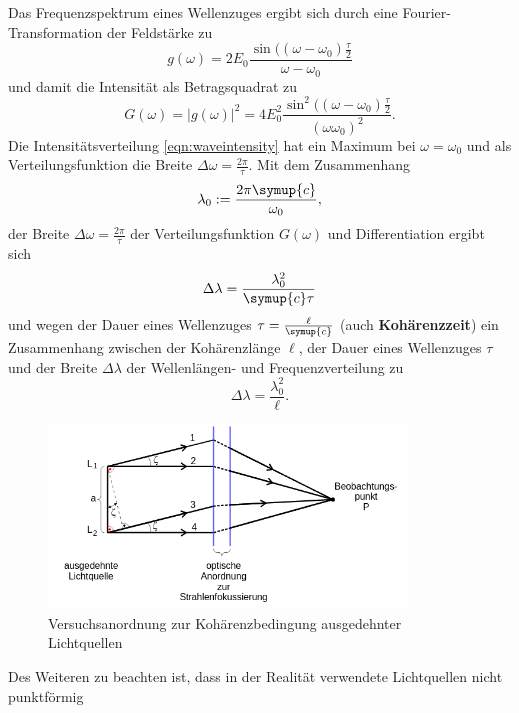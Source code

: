 Das Frequenzspektrum eines Wellenzuges ergibt sich durch eine Fourier-Transformation der
Feldstärke zu
\begin{equation}
	g(\omega) = 2E_0 \frac{\sin((\omega-\omega_0)\frac{\tau}{2}}{\omega-\omega_0}
\end{equation}
und damit die Intensität als Betragsquadrat zu
\begin{equation}
	\label{eqn:waveintensity}
	G(\omega) = |g(\omega)|^2 = 4E_0^2 \frac{\sin^2((\omega-\omega_0)\frac{\tau}{2}}{(\omega \omega_0)^2} \mathrm{.}
\end{equation}
Die Intensitätsverteilung \eqref{eqn:waveintensity} hat ein Maximum bei $\omega=\omega_0$ und
als Verteilungsfunktion die Breite $\Delta \omega = \frac{2\pi}{\tau}$.
Mit dem Zusammenhang
\begin{equation}
	\lambda_0 := \frac{2\pi \symup{c}}{\omega_0} \mathrm{,}
\end{equation}
der Breite $\Delta \omega = \frac{2\pi}{\tau}$ der Verteilungsfunktion $G(\omega)$ und
Differentiation ergibt sich
\begin{equation}
	\Delta \lambda = \frac{\lambda_0^2}{\symup{c}\tau}
\end{equation}
und wegen der Dauer eines Wellenzuges $\tau = \frac{\ell}{\symup{c}}$
(auch \textbf{Kohärenzzeit}) ein Zusammenhang zwischen der Kohärenzlänge $\ell$, der Dauer
eines Wellenzuges $\tau$ und der Breite $\Delta \lambda$ der Wellenlängen- und Frequenzverteilung zu
\begin{equation}
	\Delta \lambda = \frac{\lambda_0^2}{\ell} \mathrm{.}
\end{equation}
\begin{figure}
	\caption{Versuchsanordnung zur Kohärenzbedingung ausgedehnter Lichtquellen}
	\label{fig:...}
	\centering
	\includegraphics[width=0.85\textwidth]{Bilder/ausgedehnte_lichtquelle.png}
\end{figure}
Des Weiteren zu beachten ist, dass in der Realität verwendete Lichtquellen nicht punktförmig
